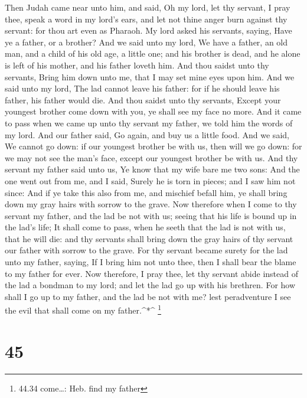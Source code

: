  Then Judah came near unto him, and said, Oh my lord, let
thy servant, I pray thee, speak a word in my lord's ears, and let not
thine anger burn against thy servant: for thou art even as Pharaoh.
 My lord asked his servants, saying, Have ye a father, or a
brother?  And we said unto my lord, We have a father, an
old man, and a child of his old age, a little one; and his brother is
dead, and he alone is left of his mother, and his father loveth him.
 And thou saidst unto thy servants, Bring him down unto me,
that I may set mine eyes upon him.  And we said unto my
lord, The lad cannot leave his father: for if he should leave his
father, his father would die.  And thou saidst unto thy
servants, Except your youngest brother come down with you, ye shall see
my face no more.  And it came to pass when we came up unto
thy servant my father, we told him the words of my lord. 
And our father said, Go again, and buy us a little food. 
And we said, We cannot go down: if our youngest brother be with us, then
will we go down: for we may not see the man's face, except our youngest
brother be with us.  And thy servant my father said unto
us, Ye know that my wife bare me two sons:  And the one
went out from me, and I said, Surely he is torn in pieces; and I saw him
not since:  And if ye take this also from me, and mischief
befall him, ye shall bring down my gray hairs with sorrow to the grave.
 Now therefore when I come to thy servant my father, and
the lad be not with us; seeing that his life is bound up in the lad's
life;  It shall come to pass, when he seeth that the lad is
not with us, that he will die: and thy servants shall bring down the
gray hairs of thy servant our father with sorrow to the grave.
 For thy servant became surety for the lad unto my father,
saying, If I bring him not unto thee, then I shall bear the blame to my
father for ever.  Now therefore, I pray thee, let thy
servant abide instead of the lad a bondman to my lord; and let the lad
go up with his brethren.  For how shall I go up to my
father, and the lad be not with me? lest peradventure I see the evil
that shall come on my father.\^{}*\^{} \footnote{44.34 come\ldots: Heb.
  find my father}

\hypertarget{section-44}{%
\section{45}\label{section-44}}

